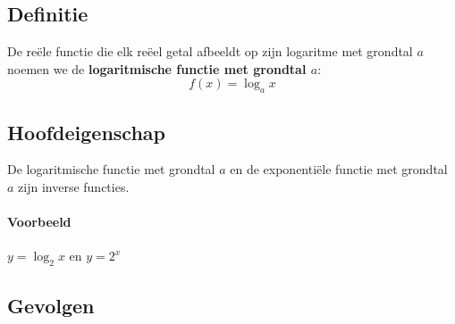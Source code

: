 \documentclass[12pt,twoside]{article}
\begin{document}
\subsection{Definitie}
De reële functie die elk reëel getal afbeeldt op zijn logaritme met grondtal $a$ noemen we de {\bf logaritmische functie met grondtal $a$}:
$$f(x) = \log_a x$$

\subsection{Hoofdeigenschap}

\begin{mdframed}
De logaritmische functie met grondtal $a$ en de exponentiële functie met grondtal $a$ zijn inverse functies.
\end{mdframed}

\paragraph{Voorbeeld} $y=\log_2 x$ en $y=2^x$

\subsection{Gevolgen}
\end{document}
